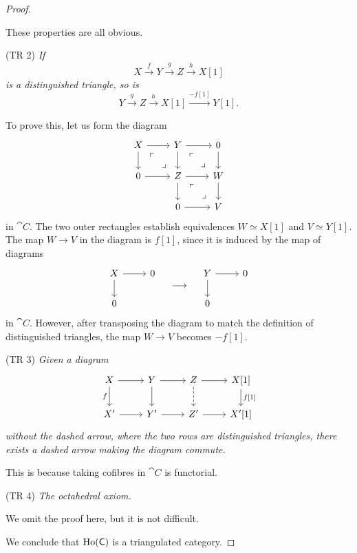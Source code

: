 \begin{proof}
\begin{itms}
        These properties are all obvious.

        \item (TR 2)
        \emph{If
        \[X\xrightarrow{f}Y\xrightarrow{g}Z\xrightarrow{h}X[1]\]
        is a distinguished triangle, so is
        \[Y\xrightarrow{g}Z\xrightarrow{h}X[1]\xrightarrow{-f[1]}Y[1].\]}%

        To prove this, let us form the diagram 
        \[\begin{tikzcd}
            X\ar[r]\ar[d]\ar[dr,phantom,"\ulcorner" pos=.25,"\lrcorner" pos=.75] &
            Y\ar[r]\ar[d]\ar[dr,phantom,"\ulcorner" pos=.25,"\lrcorner" pos=.75] & 0\ar[d] \\
            0\ar[r] &
            Z\ar[r]\ar[d]\ar[dr,phantom,"\ulcorner" pos=.25,"\lrcorner" pos=.75] &
            W\ar[d] \\
            & 0\ar[r] & V
        \end{tikzcd}\]
        in $\cat{C}$.
        The two outer rectangles establish equivalences $W\simeq X[1]$ and $V\simeq Y[1]$.
        The map $W\to V$ in the diagram is $f[1]$,
        since it is induced by the map of diagrams
        \[\begin{tikzcd}
            X\ar[r]\ar[d] & 0 \\ 0
        \end{tikzcd}
        \quad\longrightarrow\quad
        \begin{tikzcd}
            Y\ar[r]\ar[d] & 0 \\ 0
        \end{tikzcd}\]
        in $\cat C$. However, after transposing the diagram 
        to match the definition of distinguished triangles,
        the map $W\to V$ becomes $-f[1]$.

        \item (TR 3)
        \emph{Given a diagram}
        \[\begin{tikzcd}
            X\ar[r]\ar[d,"f"'] & Y\ar[r]\ar[d] & Z\ar[r]\ar[d,dashed] & X[1]\ar[d,"f\lbrack1\rbrack"] \\
            X'\ar[r] & Y'\ar[r] & Z'\ar[r] & X'[1]
        \end{tikzcd}\]
        \emph{without the dashed arrow, where the two rows are distinguished triangles,
        there exists a dashed arrow making the diagram commute.}

        This is because taking cofibres in $\cat{C}$ is functorial.

        \item (TR 4)
        \emph{The octahedral axiom.}

        We omit the proof here, but it is not difficult.
    \end{itms}

    We conclude that $\operatorname{Ho}(\mathsf{C})$
    is a triangulated category.
\end{proof}

